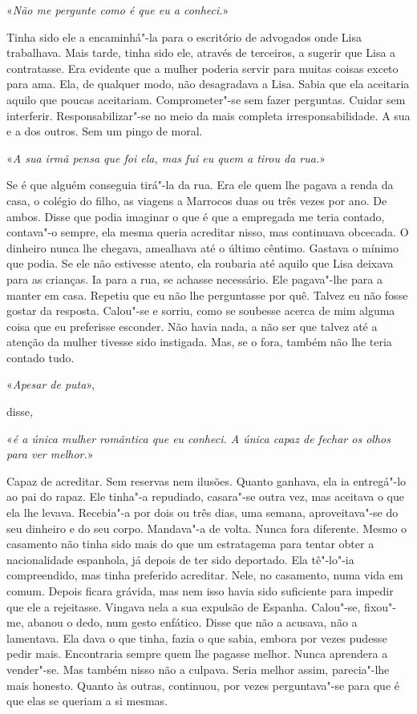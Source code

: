 «\emph{Não me pergunte como é que eu a conheci.}»

Tinha sido ele a encaminhá"-la para o escritório de advogados onde Lisa
trabalhava. Mais tarde, tinha sido ele, através de terceiros, a sugerir
que Lisa a contratasse. Era evidente que a mulher poderia servir para
muitas coisas exceto para ama. Ela, de qualquer modo, não desagradava a
Lisa. Sabia que ela aceitaria aquilo que poucas aceitariam.
Comprometer"-se sem fazer perguntas. Cuidar sem interferir.
Responsabilizar"-se no meio da mais completa irresponsabilidade. A sua e
a dos outros. Sem um pingo de moral.

«\emph{A sua irmã pensa que foi ela, mas fui eu quem a tirou da rua.}»

Se é que alguém conseguia tirá"-la da rua. Era ele quem lhe pagava a
renda da casa, o colégio do filho, as viagens a Marrocos duas ou três
vezes por ano. De ambos. Disse que podia imaginar o que é que a
empregada me teria contado, contava"-o sempre, ela mesma queria
acreditar nisso, mas continuava obcecada. O dinheiro nunca lhe chegava,
amealhava até o último cêntimo. Gastava o mínimo que podia. Se ele não
estivesse atento, ela roubaria até aquilo que Lisa deixava para as
crianças. Ia para a rua, se achasse necessário. Ele pagava"-lhe para a
manter em casa. Repetiu que eu não lhe perguntasse por quê. Talvez eu não
fosse gostar da resposta. Calou"-se e sorriu, como se soubesse acerca de
mim alguma coisa que eu preferisse esconder. Não havia nada, a não ser
que talvez até a atenção da mulher tivesse sido instigada. Mas, se o
fora, também não lhe teria contado tudo.

«\emph{Apesar de puta}»,

disse\emph{,}

«\emph{é a única mulher romântica que eu conheci. A única capaz de
fechar os olhos para ver melhor.}»

Capaz de acreditar. Sem reservas nem ilusões. Quanto ganhava, ela ia
entregá"-lo ao pai do rapaz. Ele tinha"-a repudiado, casara"-se outra
vez, mas aceitava o que ela lhe levava. Recebia"-a por dois ou três
dias, uma semana, aproveitava"-se do seu dinheiro e do seu corpo.
Mandava"-a de volta. Nunca fora diferente. Mesmo o casamento não tinha
sido mais do que um estratagema para tentar obter a nacionalidade
espanhola, já depois de ter sido deportado. Ela tê"-lo"-ia compreendido,
mas tinha preferido acreditar. Nele, no casamento, numa vida em comum.
Depois ficara grávida, mas nem isso havia sido suficiente para impedir
que ele a rejeitasse. Vingava nela a sua expulsão de Espanha. Calou"-se,
fixou"-me, abanou o dedo, num gesto enfático. Disse que não a acusava,
não a lamentava. Ela dava o que tinha, fazia o que sabia, embora por
vezes pudesse pedir mais. Encontraria sempre quem lhe pagasse melhor.
Nunca aprendera a vender"-se. Mas também nisso não a culpava. Seria
melhor assim, parecia"-lhe mais honesto. Quanto às outras, continuou,
por vezes perguntava"-se para que é que elas se queriam a si mesmas.

